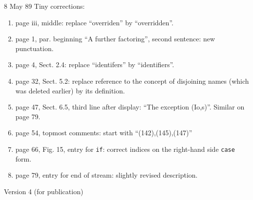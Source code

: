 \begin{description}
\item{8 May 89} Tiny corrections:
\begin{enumerate}
\item page iii, middle: replace ``overriden'' by ``overridden''.
\item page 1, par. beginning ``A further factoring'', second sentence:
new punctuation.
\item page 4, Sect. 2.4: replace ``identifers'' by ``identifiers''.
\item page 32, Sect. 5.2: replace reference to the concept of disjoining
names (which was deleted earlier) by its definition.
\item page 47, Sect. 6.5, third line after display: ``The exception
(Io,s)''. Similar on page 79.
\item page 54, topmost comments: start with ``(142),(145),(147)''
\item page 66, Fig. 15, entry for {\tt if}: correct indices on the
right-hand side {\tt case} form.
\item page 79, entry for end of stream: slightly revised description.
\end{enumerate}
\end{description}
\begin{center}
\large Version 4 (for publication)
\end{center}

